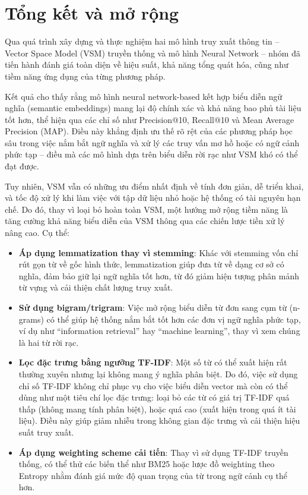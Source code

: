 \chapter{Tổng kết và mở rộng}
Qua quá trình xây dựng và thực nghiệm hai mô hình truy xuất thông tin -- Vector Space Model (VSM) truyền thống và mô hình Neural Network -- nhóm đã tiến hành đánh giá toàn diện về hiệu suất, khả năng tổng quát hóa, cũng như tiềm năng ứng dụng của từng phương pháp.

Kết quả cho thấy rằng mô hình neural network-based kết hợp biểu diễn ngữ nghĩa (semantic embeddings) mang lại độ chính xác và khả năng bao phủ tài liệu tốt hơn, thể hiện qua các chỉ số như Precision@10, Recall@10 và Mean Average Precision (MAP). Điều này khẳng định ưu thế rõ rệt của các phương pháp học sâu trong việc nắm bắt ngữ nghĩa và xử lý các truy vấn mơ hồ hoặc có ngữ cảnh phức tạp -- điều mà các mô hình dựa trên biểu diễn rời rạc như VSM khó có thể đạt được.

Tuy nhiên, VSM vẫn có những ưu điểm nhất định về tính đơn giản, dễ triển khai, và tốc độ xử lý khi làm việc với tập dữ liệu nhỏ hoặc hệ thống có tài nguyên hạn chế. Do đó, thay vì loại bỏ hoàn toàn VSM, một hướng mở rộng tiềm năng là tăng cường khả năng biểu diễn của VSM thông qua các chiến lược tiền xử lý nâng cao. Cụ thể:

\begin{itemize}
    \item \textbf{Áp dụng lemmatization thay vì stemming}: Khác với stemming vốn chỉ rút gọn từ về gốc hình thức, lemmatization giúp đưa từ về dạng cơ sở có nghĩa, đảm bảo giữ lại ngữ nghĩa tốt hơn, từ đó giảm hiện tượng phân mảnh từ vựng và cải thiện chất lượng truy xuất.

    \item \textbf{Sử dụng bigram/trigram}: Việc mở rộng biểu diễn từ đơn sang cụm từ (n-grams) có thể giúp hệ thống nắm bắt tốt hơn các đơn vị ngữ nghĩa phức tạp, ví dụ như “information retrieval” hay “machine learning”, thay vì xem chúng là hai từ rời rạc.
    \item \textbf{Lọc đặc trưng bằng ngưỡng TF-IDF}: Một số từ có thể xuất hiện rất thường xuyên nhưng lại không mang ý nghĩa phân biệt. Do đó, việc sử dụng chỉ số TF-IDF không chỉ phục vụ cho việc biểu diễn vector mà còn có thể dùng như một tiêu chí lọc đặc trưng: loại bỏ các từ có giá trị TF-IDF quá thấp (không mang tính phân biệt), hoặc quá cao (xuất hiện trong quá ít tài liệu). Điều này giúp giảm nhiễu trong không gian đặc trưng và cải thiện hiệu suất truy xuất.
    \item \textbf{Áp dụng weighting scheme cải tiến}: Thay vì sử dụng TF-IDF truyền thống, có thể thử các biến thể như BM25 hoặc lược đồ weighting theo Entropy nhằm đánh giá mức độ quan trọng của từ trong ngữ cảnh cụ thể hơn.
\end{itemize}

